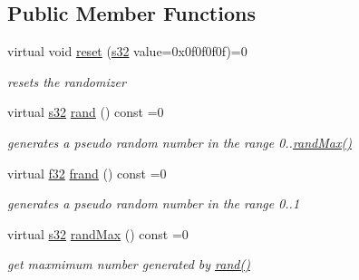 \subsection*{Public Member Functions}
\begin{DoxyCompactItemize}
\item 
virtual void \hyperlink{classirr_1_1IRandomizer_ac9d7c9464698f6e183992fb895fa5ac4}{reset} (\hyperlink{namespaceirr_ac66849b7a6ed16e30ebede579f9b47c6}{s32} value=0x0f0f0f0f)=0
\begin{DoxyCompactList}\small\item\em resets the randomizer \end{DoxyCompactList}\item 
\mbox{\label{classirr_1_1IRandomizer_a3a31414f525aad0c8815a451340a2729}} 
virtual \hyperlink{namespaceirr_ac66849b7a6ed16e30ebede579f9b47c6}{s32} \hyperlink{classirr_1_1IRandomizer_a3a31414f525aad0c8815a451340a2729}{rand} () const =0
\begin{DoxyCompactList}\small\item\em generates a pseudo random number in the range 0..\hyperlink{classirr_1_1IRandomizer_ac5f1856ac9e8a33bbb5ce1493cc6f351}{rand\+Max()} \end{DoxyCompactList}\item 
\mbox{\label{classirr_1_1IRandomizer_ab48106f4d9f171f31a39c147be2df9d6}} 
virtual \hyperlink{namespaceirr_a0277be98d67dc26ff93b1a6a1d086b07}{f32} \hyperlink{classirr_1_1IRandomizer_ab48106f4d9f171f31a39c147be2df9d6}{frand} () const =0
\begin{DoxyCompactList}\small\item\em generates a pseudo random number in the range 0..1 \end{DoxyCompactList}\item 
\mbox{\label{classirr_1_1IRandomizer_ac5f1856ac9e8a33bbb5ce1493cc6f351}} 
virtual \hyperlink{namespaceirr_ac66849b7a6ed16e30ebede579f9b47c6}{s32} \hyperlink{classirr_1_1IRandomizer_ac5f1856ac9e8a33bbb5ce1493cc6f351}{rand\+Max} () const =0
\begin{DoxyCompactList}\small\item\em get maxmimum number generated by \hyperlink{classirr_1_1IRandomizer_a3a31414f525aad0c8815a451340a2729}{rand()} \end{DoxyCompactList}\end{DoxyCompactItemize}
